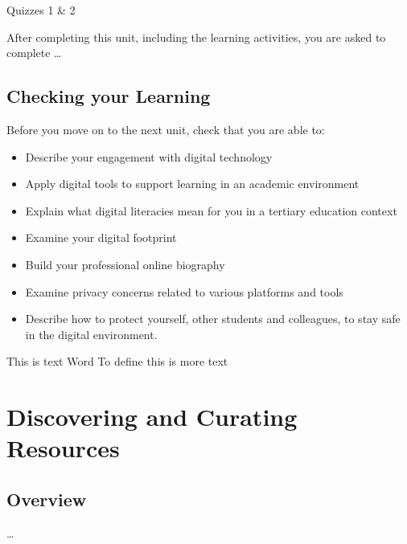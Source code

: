 \documentclass[
]{book}
\providecommand{\tightlist}{%
  \setlength{\itemsep}{0pt}\setlength{\parskip}{0pt}}
\theoremstyle{definition}
\theoremstyle{definition}
\theoremstyle{definition}
\theoremstyle{definition}
\theoremstyle{remark}
\begin{document}
\begin{assessment}
{Quizzes 1 \& 2}

After completing this unit, including the learning activities, you are asked to complete \ldots{}
\end{assessment}

\hypertarget{checking-your-learning}{%
\section*{Checking your Learning}\label{checking-your-learning}}

\begin{progress}
Before you move on to the next unit, check that you are able to:

\begin{itemize}
\tightlist
\item
  Describe your engagement with digital technology
\item
  Apply digital tools to support learning in an academic environment
\item
  Explain what digital literacies mean for you in a tertiary education context
\item
  Examine your digital footprint
\item
  Build your professional online biography
\item
  Examine privacy concerns related to various platforms and tools
\item
  Describe how to protect yourself, other students and colleagues, to stay safe in the digital environment.
\end{itemize}
\end{progress}

This is text Word To define this is more text

\hypertarget{discovering-and-curating-resources}{%
\chapter{Discovering and Curating Resources}\label{discovering-and-curating-resources}}

\hypertarget{overview-1}{%
\section*{Overview}\label{overview-1}}

\ldots{}
\end{document}
